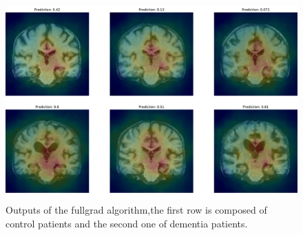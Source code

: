 \begin{figure}
    \centering
    \includegraphics[width=1\linewidth]{figures/Experiements/output_fullgrad.pdf}
    \caption{Outputs of the fullgrad algorithm,the first row is composed of control patients and the second one of dementia patients. }
    \label{fig:fullgrad_output}
\end{figure}